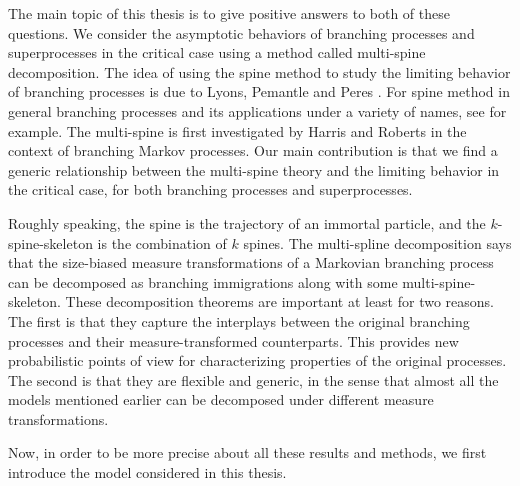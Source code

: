 \documentclass[UTF8]{pkuthss}
\theoremstyle{plain}
\theoremstyle{definition}
\numberwithin{equation}{section}
\begin{document}
    The main topic of this thesis is to give positive answers to both of these questions. 
    We consider the asymptotic behaviors of branching processes and superprocesses in the critical case using a method called multi-spine decomposition. 
    The idea of using the spine method to study the limiting behavior of branching processes is due to Lyons, Pemantle and Peres \cite{LyonsPemantlePeres1995Conceptual}. 
    For spine method in general branching processes and its applications under a variety of names, see \cite{Aidekon2013Convergence,AidekonShi2014The-Seneta-Heyde,BigginsKyprianou2004Measure,ChauvinRouault1988KPP-equation,Englander2009Law,EnglanderHarrisKyprianou2010Strong,EnglanderKyprianou2004Local,GeorgiiBaake2003Supercritical,HuShi2009Minimal,Lambert2007Quasi-stationary,LiuRenSong2011LlogL,RenYang2014Multitype} for example.
    The multi-spine is first investigated by Harris and Roberts \cite{HarrisRoberts2017The-many-to-few} in the context of branching Markov processes. 
    Our main contribution is that we find a generic relationship between the multi-spine theory and the limiting behavior in the critical case, for both branching processes and superprocesses.


    Roughly speaking, the spine is the trajectory of an immortal particle, and the $k$-spine-skeleton is the combination of $k$ spines.
    The multi-spline decomposition says that the size-biased measure transformations of a Markovian branching process can be decomposed as branching immigrations along with some multi-spine-skeleton.
    These decomposition theorems are important at least for two reasons. 
    The first is that they capture the interplays between the original branching processes and their measure-transformed counterparts. 
    This provides new probabilistic points of view for characterizing properties of the original processes.
    The second is that they are flexible and generic, in the sense that almost all the models mentioned earlier can be decomposed under different measure transformations. 

    Now, in order to be more precise about all these results and methods, we first introduce the model considered in this thesis.
\end{document}
